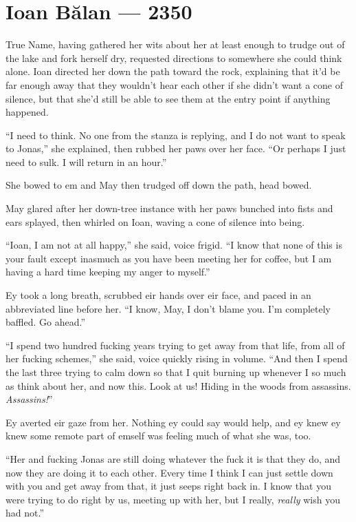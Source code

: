 \hypertarget{ioan-bux103lan-2350}{%
\chapter{Ioan Bălan — 2350}\label{ioan-bux103lan-2350}}

True Name, having gathered her wits about her at least enough to trudge out of the lake and fork herself dry, requested directions to somewhere she could think alone. Ioan directed her down the path toward the rock, explaining that it'd be far enough away that they wouldn't hear each other if she didn't want a cone of silence, but that she'd still be able to see them at the entry point if anything happened.

``I need to think. No one from the stanza is replying, and I do not want to speak to Jonas,'' she explained, then rubbed her paws over her face. ``Or perhaps I just need to sulk. I will return in an hour.''

She bowed to em and May then trudged off down the path, head bowed.

May glared after her down-tree instance with her paws bunched into fists and ears splayed, then whirled on Ioan, waving a cone of silence into being.

``Ioan, I am not at all happy,'' she said, voice frigid. ``I know that none of this is your fault except inasmuch as you have been meeting her for coffee, but I am having a hard time keeping my anger to myself.''

Ey took a long breath, scrubbed eir hands over eir face, and paced in an abbreviated line before her. ``I know, May, I don't blame you. I'm completely baffled. Go ahead.''

``I spend two hundred fucking years trying to get away from that life, from all of her fucking schemes,'' she said, voice quickly rising in volume. ``And then I spend the last three trying to calm down so that I quit burning up whenever I so much as think about her, and now this. Look at us! Hiding in the woods from assassins. \emph{Assassins!}''

Ey averted eir gaze from her. Nothing ey could say would help, and ey knew ey knew some remote part of emself was feeling much of what she was, too.

``Her and fucking Jonas are still doing whatever the fuck it is that they do, and now they are doing it to each other. Every time I think I can just settle down with you and get away from that, it just seeps right back in. I know that you were trying to do right by us, meeting up with her, but I really, \emph{really} wish you had not.''

